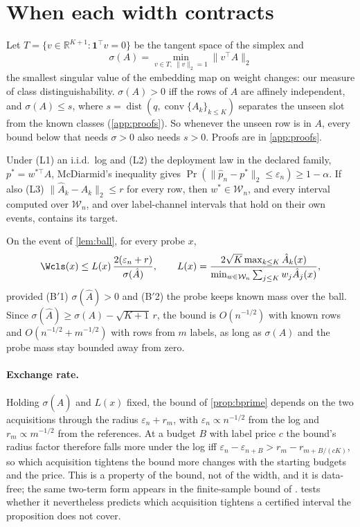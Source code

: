 \section{When each width contracts}
\label{sec:theory}

Let $T=\{v\in\mathbb R^{K+1}:\mathbf 1^{\top}v=0\}$ be the tangent space of the simplex and
\[
\sigma(A)=\min_{v\in T,\ \lVert v\rVert_2=1}\lVert v^{\top}A\rVert_2
\]
the smallest singular value of the embedding map on weight changes: our measure of class
distinguishability. $\sigma(A)>0$ iff the rows of $A$ are affinely independent, and
$\sigma(A)\le s$, where $s=\operatorname{dist}(q,\operatorname{conv}\{A_k\}_{k\le K})$ separates the
unseen slot from the known classes (\cref{app:proofs}). So whenever the unseen row is in $A$, every
bound below that needs $\sigma>0$ also needs $s>0$. Proofs are in \cref{app:proofs}.

\begin{lemma}
\label{lem:ball}
Under (L1) an i.i.d.\ log and (L2) the deployment law in the declared family, $p^{*}=w^{*\top}A$,
McDiarmid's inequality gives $\Pr(\lVert \hat p_n-p^{*}\rVert_2\le\varepsilon_n)\ge 1-\alpha$. If also
(L3) $\lVert\hat A_k-A_k\rVert_2\le r$ for every row, then $w^{*}\in\mathcal W_n$, and every interval
computed over $\mathcal W_n$, and over label-channel intervals that hold on their own events, contains
its target.
\end{lemma}

\begin{proposition}
\label{prop:bprime}
On the event of \cref{lem:ball}, for every probe $x$,
\[
\Wcls(x)\le L(x)\,\frac{2(\varepsilon_n+r)}{\sigma(\hat A)},\qquad
L(x)=\frac{2\sqrt{K}\max_{k\le K}\hat A_k(x)}{\min_{w\in\mathcal W_n}\sum_{j\le K}w_j\hat A_j(x)},
\]
provided (B$'$1) $\sigma(\hat A)>0$ and (B$'$2) the probe keeps known mass over the ball. Since
$\sigma(\hat A)\ge\sigma(A)-\sqrt{K+1}\,r$, the bound is $O(n^{-1/2})$ with known rows and
$O(n^{-1/2}+m^{-1/2})$ with rows from $m$ labels, as long as $\sigma(A)$ and the probe mass stay
bounded away from zero.
\end{proposition}

\paragraph{Exchange rate.} Holding $\sigma(\hat A)$ and $L(x)$ fixed, the bound of \cref{prop:bprime}
depends on the two acquisitions through the radius $\varepsilon_n+r_m$, with $\varepsilon_n\propto
n^{-1/2}$ from the log and $r_m\propto m^{-1/2}$ from the references. At a budget $B$ with label price $c$
the bound's radius factor therefore falls more under the log iff
$\varepsilon_{n}-\varepsilon_{n+B}>r_m-r_{m+B/(cK)}$, so which acquisition tightens the bound more changes
with the starting budgets and the price. This is a property of the bound, not of the width, and it is
data-free; the same two-term form appears in the finite-sample bound of \citet[Thm.~3]{lipton2018detecting}.  tests whether it nevertheless predicts which acquisition tightens a
certified interval the proposition does not cover.

